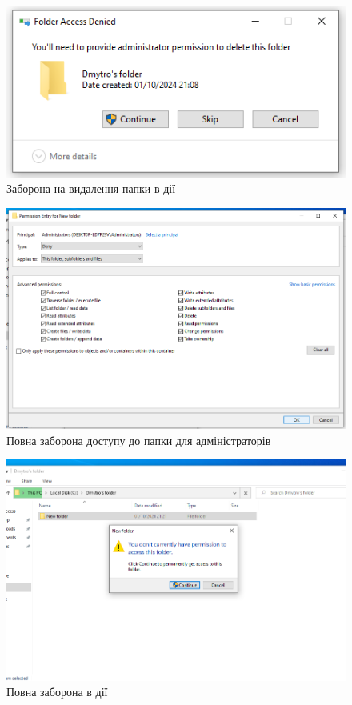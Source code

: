 \documentclass[oneside,14pt]{extarticle}
\begin{document}
\begin{normalsize}
	\begin{figure}[H]
		\centering
		\includegraphics[width=\columnwidth]{3}
		\caption{Заборона на видалення папки в дії}
	\end{figure}
	
	\begin{figure}[H]
		\centering
		\includegraphics[width=\columnwidth]{4}
		\caption{Повна заборона доступу до папки для адміністраторів}
	\end{figure}
	
	\begin{figure}[H]
		\centering
		\includegraphics[width=\columnwidth]{5}
		\caption{Повна заборона в дії}
	\end{figure}
	

\end{normalsize}
\end{document}
